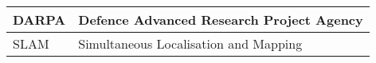 



\begin{longtable}{p{90pt}l}
\hline DARPA		 & Defence Advanced Research Project Agency \\ 
\hline SLAM      & Simultaneous Localisation and Mapping \\
\hline
\end{longtable}






